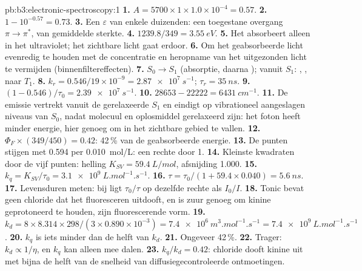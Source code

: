 \begin{solution}{pb:b3:electronic-spectroscopy:1}
\textbf{1.} $A = 5700 \times 1 \times 1.0\times10^{-4} = 0.57$.
\textbf{2.} $1 - 10^{-0.57} = 0.73$.
\textbf{3.} Een $\varepsilon$ van enkele duizenden: een toegestane overgang
$\pi\to\pi^*$, van gemiddelde sterkte.
\textbf{4.} $1239.8/349 = \qty{3.55}{eV}$.
\textbf{5.} Het absorbeert alleen in het ultraviolet; het zichtbare licht
gaat erdoor.
\textbf{6.} Om het geabsorbeerde licht evenredig te houden met de
concentratie en heropname van het uitgezonden licht te vermijden
(binnenfiltereffecten).
\textbf{7.} $S_0 \to S_1$ (absorptie, daarna ); vanuit $S_1$:
, ,  naar $T_1$.
\textbf{8.} $k_r = 0.546/19 \times 10^{-9} = \qty{2.87e7}{s^{-1}}$; $\tau_r = \qty{35}{ns}$.
\textbf{9.} $(1 - 0.546)/\tau_0 = \qty{2.39e7}{s^{-1}}$.
\textbf{10.} $28653 - 22222 = \qty{6431}{cm^{-1}}$.
\textbf{11.} De emissie vertrekt vanuit de gerelaxeerde $S_1$ en eindigt op
vibrationeel aangeslagen niveaus van $S_0$, nadat molecuul en oplosmiddel
gerelaxeerd zijn: het foton heeft minder energie, hier genoeg om in het
zichtbare gebied te vallen.
\textbf{12.} $\Phi_F \times (349/450) = 0.42$: 42\,\% van de geabsorbeerde energie.
\textbf{13.} De punten stijgen met 0.594 per \qty{0.010}{mol/L}: een rechte door 1.
\textbf{14.} Kleinste kwadraten door de vijf punten: helling $K_{SV} = \qty{59.4}{L/mol}$,
afsnijding 1.000.
\textbf{15.} $k_q = K_{SV}/\tau_0 = \qty{3.1e9}{L.mol^{-1}.s^{-1}}$.
\textbf{16.} $\tau = \tau_0/(1 + 59.4 \times 0.040) = \qty{5.6}{ns}$.
\textbf{17.} Levensduren meten: bij  ligt $\tau_0/\tau$
op dezelfde rechte als $I_0/I$.
\textbf{18.} Tonic bevat geen chloride dat het fluoresceren uitdooft, en is
zuur genoeg om kinine geprotoneerd te houden, zijn fluorescerende vorm.
\textbf{19.} $k_d = 8 \times 8.314 \times 298/(3 \times 0.890\times10^{-3}) =
\qty{7.4e6}{m^3.mol^{-1}.s^{-1}} = \qty{7.4e9}{L.mol^{-1}.s^{-1}}$.
\textbf{20.} $k_q$ is iets minder dan de helft van $k_d$.
\textbf{21.} Ongeveer 42\,\%.
\textbf{22.} Trager: $k_d \propto 1/\eta$, en $k_q$ kan alleen mee dalen.
\textbf{23.} \textbf{$k_q/k_d = 0.42$}: chloride dooft kinine uit met bijna
de helft van de snelheid van diffusiegecontroleerde ontmoetingen.
\end{solution}
